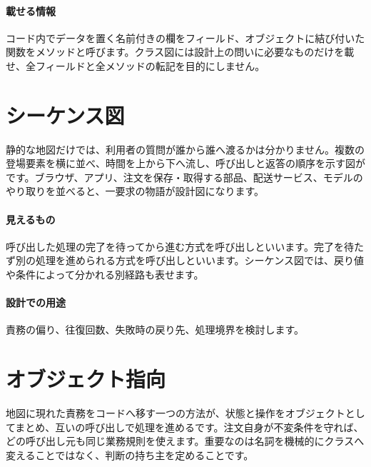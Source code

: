 \paragraph{載せる情報}
        コード内でデータを置く名前付きの欄をフィールド、オブジェクトに結び付いた関数をメソッドと呼びます。クラス図には設計上の問いに必要なものだけを載せ、全フィールドと全メソッドの転記を目的にしません。

\par
\endgroup
\par
\endgroup


\section{シーケンス図}
\label{sec:04-software-engineering-11}

静的な地図だけでは、利用者の質問が誰から誰へ渡るかは分かりません。複数の登場要素を横に並べ、時間を上から下へ流し、呼び出しと返答の順序を示す図がです。ブラウザ、アプリ、注文を保存・取得する部品、配送サービス、モデルのやり取りを並べると、一要求の物語が設計図になります。

\begingroup
  \centering
  \vspace{1mm}
\begingroup
\paragraph{見えるもの}
        呼び出した処理の完了を待ってから進む方式を呼び出しといいます。完了を待たず別の処理を進められる方式を呼び出しといいます。シーケンス図では、戻り値や条件によって分かれる別経路も表せます。

\par
\endgroup
\medskip
\begingroup
\paragraph{設計での用途}
        責務の偏り、往復回数、失敗時の戻り先、処理境界を検討します。

\par
\endgroup
\par
\endgroup


\section{オブジェクト指向}
\label{sec:04-software-engineering-12}

地図に現れた責務をコードへ移す一つの方法が、状態と操作をオブジェクトとしてまとめ、互いの呼び出しで処理を進めるです。注文自身が不変条件を守れば、どの呼び出し元も同じ業務規則を使えます。重要なのは名詞を機械的にクラスへ変えることではなく、判断の持ち主を定めることです。

